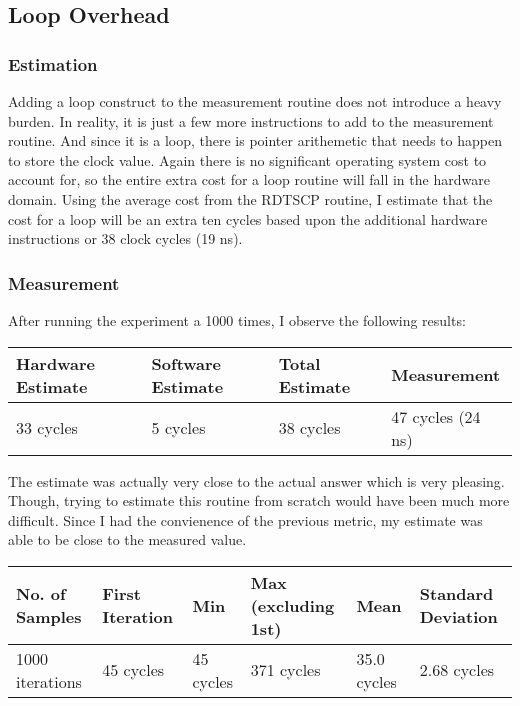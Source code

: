 \documentclass[paper=a4, fontsize=11pt]{scrartcl}
\numberwithin{equation}{section}        %
\numberwithin{figure}{section}          %
\numberwithin{table}{section}               %
\begin{document}
\subsection{Loop Overhead}

\subsubsection{Estimation}

Adding a loop construct to the measurement routine does not introduce a heavy burden.  In reality, it is just a few more instructions to add to the measurement routine.  And since it is a loop, there is pointer arithemetic that needs to happen to store the clock value.  Again there is no significant operating system cost to account for, so the entire extra cost for a loop routine will fall in the hardware domain.  Using the average cost from the RDTSCP routine, I estimate that the cost for a loop will be an extra ten cycles based upon the additional hardware instructions or 38 clock cycles (19 ns).

\subsubsection{Measurement}

After running the experiment a 1000 times, I observe the following results:

\begin{center}
    \begin{tabular}{ | l | l | l | l |}
    \hline
    Hardware Estimate & Software Estimate & Total Estimate & Measurement \\ \hline
    33 cycles & 5 cycles & 38 cycles & 47 cycles (24 ns) \\ 
    \hline
    \end{tabular}
\end{center}

The estimate was actually very close to the actual answer which is very pleasing.  Though, trying to estimate this routine from scratch would have been much more difficult.  Since I had the convienence of the previous metric, my estimate was able to be close to the measured value.

\begin{center}
    \begin{tabular}{ | l | l | l | l | l | l |}
    \hline
    No. of Samples & First Iteration & Min & Max (excluding 1st) & Mean & Standard Deviation \\ \hline
    1000 iterations & 45 cycles & 45 cycles & 371 cycles & 35.0 cycles & 2.68 cycles \\ 
    \hline
    \end{tabular}
\end{center}
\end{document}

